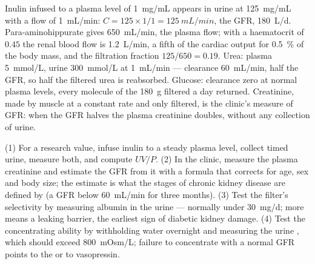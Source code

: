\begin{example}\label{ex:b3:renal-osmoregulation:numbers}
Inulin infused to a plasma level of \qty{1}{mg/mL} appears in urine at
\qty{125}{mg/mL} with a flow of \qty{1}{mL/min}: $C = 125\times 1/1 =
\qty{125}{mL/min}$, the GFR, \qty{180}{L/d}. Para-aminohippurate
gives \qty{650}{mL/min}, the plasma flow; with a haematocrit of $0.45$
the renal blood flow is \qty{1.2}{L/min}, a fifth of the cardiac
output for \qty{0.5}{\%} of the body mass, and the filtration fraction
$125/650 = 0.19$. Urea: plasma \qty{5}{mmol/L}, urine \qty{300}{mmol/L}
at \qty{1}{mL/min} --- clearance \qty{60}{mL/min}, half the GFR, so half
the filtered urea is reabsorbed. Glucose: clearance zero at normal
plasma levels, every molecule of the \qty{180}{g} filtered a day
returned. Creatinine, made by muscle at a constant rate and only
filtered, is the clinic's measure of GFR: when the GFR halves the
plasma creatinine doubles, without any collection of urine.
\end{example}

\begin{method}\label{met:b3:renal-osmoregulation:gfr}
(1) For a research value, infuse inulin to a steady plasma level,
collect timed urine, measure both, and compute $UV/P$. (2) In the
clinic, measure the plasma creatinine and estimate the GFR from it
with a formula that corrects for age, sex and body size; the estimate
is what the stages of chronic kidney disease are defined by (a GFR
below \qty{60}{mL/min} for three months). (3) Test the filter's
selectivity by measuring albumin in the urine --- normally under
\qty{30}{mg/d}; more means a leaking barrier, the earliest sign of
diabetic kidney damage. (4) Test the concentrating ability by
withholding water overnight and measuring the urine , which
should exceed \qty{800}{mOsm/L}; failure to concentrate with a normal
GFR points to the  or to vasopressin.
\end{method}

